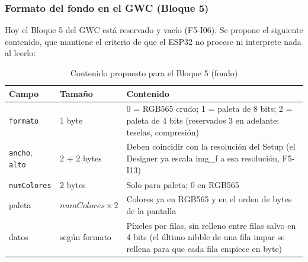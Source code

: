 \subsubsection{Formato del fondo en el GWC (Bloque 5)}

Hoy el Bloque 5 del GWC está reservado y vacío (F5-I06). Se propone el siguiente contenido, que mantiene el criterio de que el ESP32 no procese ni interprete nada al leerlo:

\begin{table}[H]
	\centering
	\begin{tabular}{llp{7.5cm}}
		\toprule
		Campo & Tamaño & Contenido \\
		\midrule
		\texttt{formato} & 1 byte & 0 = RGB565 crudo; 1 = paleta de 8 bits; 2 = paleta de 4 bits (reservados 3 en adelante: teselas, compresión) \\
		\texttt{ancho}, \texttt{alto} & 2 + 2 bytes & Deben coincidir con la resolución del Setup (el Designer ya escala img\_f a esa resolución, F5-I13) \\
		\texttt{numColores} & 2 bytes & Solo para paleta; 0 en RGB565 \\
		paleta & $numColores\times 2$ & Colores ya en RGB565 y en el orden de bytes de la pantalla \\
		datos & según formato & Píxeles por filas, sin relleno entre filas salvo en 4 bits (el último nibble de una fila impar se rellena para que cada fila empiece en byte) \\
		\bottomrule
	\end{tabular}
	\caption{Contenido propuesto para el Bloque 5 (fondo)}
	\label{tab:F6I91Bloque5}
\end{table}

